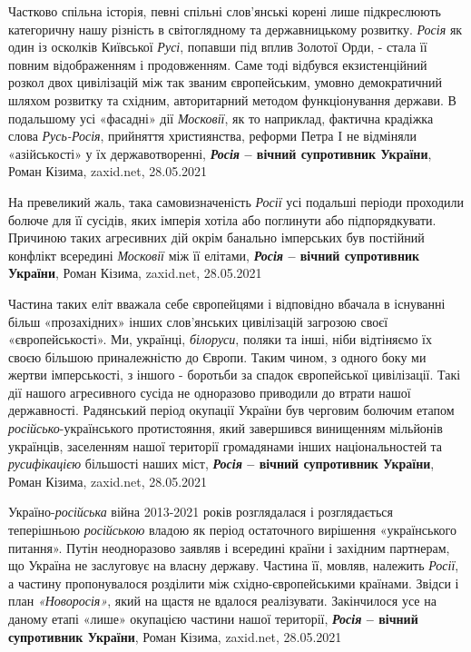 Частково спільна історія, певні спільні слов'янські корені лише підкреслюють
категоричну нашу різність в світоглядному та державницькому розвитку.
\emph{Росія} як один із осколків Київської \emph{Русі}, попавши під вплив
Золотої Орди, - стала її повним відображенням і продовженням. Саме тоді
відбувся екзистенційний розкол двох цивілізацій між так званим європейським,
умовно демократичний шляхом розвитку та східним, авторитарний методом
функціонування держави. В подальшому усі «фасадні» дії \emph{Московії}, як то
наприклад, фактична крадіжка слова \emph{Русь-Росія}, прийняття християнства,
реформи Петра I не відміняли «азійськості» у їх державотворенні,
\textbf{\emph{Росія} – вічний супротивник України}, Роман Кізима, zaxid.net, 28.05.2021

На превеликий жаль, така самовизначеність \emph{Росії} усі подальші періоди проходили
болюче для її сусідів, яких імперія хотіла або поглинути або підпорядкувати.
Причиною таких агресивних дій окрім банально імперських був постійний конфлікт
всередині \emph{Московії} між її елітами,
\textbf{\emph{Росія} – вічний супротивник України}, Роман Кізима, zaxid.net, 28.05.2021

Частина таких еліт вважала себе європейцями і відповідно вбачала в існуванні
більш «прозахідних» інших слов'янських цивілізацій загрозою своєї
«європейськості». Ми, українці, \emph{білоруси}, поляки та інші, ніби відтіняємо їх
своєю більшою приналежністю до Європи. Таким чином, з одного боку ми жертви
імперськості, з іншого - боротьби за спадок європейської цивілізації. Такі дії
нашого агресивного сусіда не одноразово приводили до втрати нашої державності.
Радянський період окупації України був черговим болючим етапом
\emph{російсько}-українського протистояння, який завершився винищенням мільйонів
українців, заселенням нашої території громадянами інших національностей та
\emph{русифікацією} більшості наших міст,
\textbf{\emph{Росія} – вічний супротивник України}, Роман Кізима, zaxid.net, 28.05.2021

Україно-\emph{російська} війна 2013-2021 років розглядалася і розглядається
теперішньою \emph{російською} владою як період остаточного вирішення «українського
питання». Путін неодноразово заявляв і всередині країни і західним партнерам,
що Україна не заслуговує на власну державу. Частина її, мовляв, належить
\emph{Росії}, а частину пропонувалося розділити між східно-європейськими країнами.
Звідси і план \emph{«Новоросія»}, який на щастя не вдалося реалізувати. Закінчилося
усе на даному етапі «лише» окупацією частини нашої території,
\textbf{\emph{Росія} – вічний супротивник України}, Роман Кізима, zaxid.net, 28.05.2021

